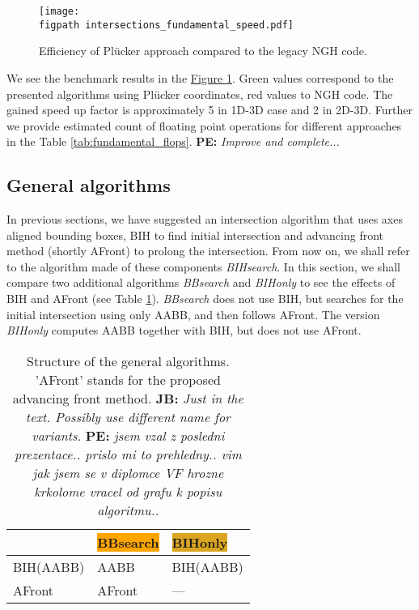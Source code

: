 \documentclass{elsarticle}
\newcommand{\fig}[1]{\hyperref[#1]{Figure \ref{#1}}}
\newcommand{\figpath}{figures/}
\newcommand{\noteJB}[1]{{\color{Blue} \textbf{JB: } \textit{#1}}}
\newcommand{\notePE}[1]{{\color{Orange} \textbf{PE: } \textit{#1}}}
\newcommand{\plucker}{Pl\"{u}cker }
\newcommand{\ngh}{NGH }
\begin{document}
\begin{figure}[!htb]
    \centering
    \texttt{[image: \\figpath intersections\_fundamental\_speed.pdf]}
    \caption{Efficiency of \plucker approach compared to the legacy \ngh code.}
    \label{fig:fundamental_speed}
\end{figure}

We see the benchmark results in the \fig{fig:fundamental_speed}. Green values correspond to the presented algorithms
using \plucker coordinates, red values to \ngh code. The gained speed up factor is approximately 5 in 1D-3D case and 2 in 2D-3D. Further we provide estimated count of floating point operations for different approaches in the Table \ref{tab:fundamental_flops}.
\notePE{Improve and complete...}

\subsection{General algorithms}
In previous sections, we have suggested an intersection algorithm that uses axes aligned bounding boxes, BIH to find initial
intersection and advancing front method (shortly AFront) to prolong the intersection. From now on, we shall refer to the algorithm made of these components \emph{BIHsearch}. In this section, we shall compare two additional algorithms \emph{BBsearch} and \emph{BIHonly} to see the effects of BIH and AFront (see Table \ref{tab:search_algorithms}). \emph{BBsearch} does not use BIH, but searches for the initial intersection using only AABB, and then follows AFront. The version 
\emph{BIHonly} computes AABB together with BIH, but does not use AFront.


\begin{table}[!htb]
    \centering
    \renewcommand{\arraystretch}{1.2}
    \begin{tabular}{>{\centering\arraybackslash}p{20ex}
                    >{\centering\arraybackslash}p{20ex}
                    >{\centering\arraybackslash}p{20ex}}
        \colorbox{NavyBlue}{\textcolor{white}{BIHsearch\vphantom{By}}} & \colorbox{orange}{BBsearch\vphantom{By}} & \colorbox{Goldenrod}{BIHonly\vphantom{By}} \\ \hline
        BIH(AABB) & AABB & BIH(AABB) \\
        AFront & AFront & ---
    \end{tabular}
    \caption{Structure of the general algorithms. 'AFront' stands for the proposed advancing front method.
    \noteJB{Just in the text. Possibly use different name for variants.}
    \notePE{jsem vzal z posledni prezentace.. prislo mi to prehledny.. vim jak jsem se v diplomce VF hrozne krkolome vracel od grafu k popisu algoritmu..}}
    \label{tab:search_algorithms}
\end{table}
\end{document}
